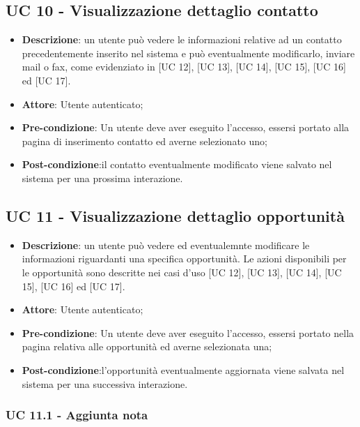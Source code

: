 \subsection{UC 10 - Visualizzazione dettaglio contatto}

\begin{itemize}
	\item \textbf{Descrizione}: un utente può vedere le informazioni relative ad un contatto precedentemente inserito nel sistema e può eventualmente modificarlo, inviare mail o fax, come evidenziato in [UC 12], [UC 13], [UC 14], [UC 15], [UC 16] ed [UC 17].\\
	\item \textbf{Attore}: Utente autenticato;
	\item \textbf{Pre-condizione}: Un utente deve aver eseguito l'accesso, essersi portato alla pagina di inserimento contatto ed averne selezionato uno;
	\item \textbf{Post-condizione}:il contatto eventualmente modificato viene salvato nel sistema per una prossima interazione.
\end{itemize}

\subsection{UC 11 - Visualizzazione dettaglio opportunità}

\begin{itemize}
	\item \textbf{Descrizione}: un utente può vedere ed eventualemnte modificare le informazioni riguardanti una specifica opportunità. Le azioni disponibili per le opportunità sono descritte nei casi  d'uso [UC 12], [UC 13], [UC 14], [UC 15], [UC 16] ed [UC 17].\\
	\item \textbf{Attore}: Utente autenticato;
	\item \textbf{Pre-condizione}: Un utente deve aver eseguito l'accesso, essersi portato nella pagina relativa alle opportunità ed averne selezionata una;
	\item \textbf{Post-condizione}:l'opportunità eventualmente aggiornata viene salvata nel sistema per una successiva interazione.
\end{itemize}

\subsubsection{UC 11.1 - Aggiunta nota} %

